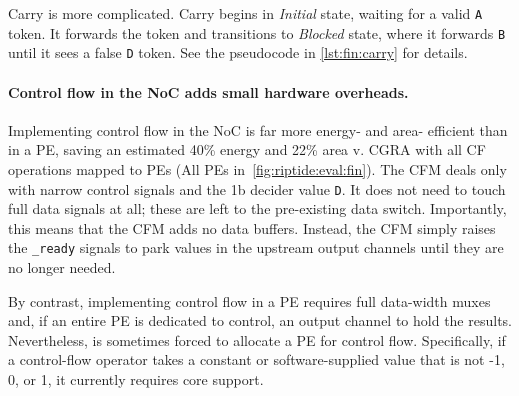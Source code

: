 Carry is more complicated.
%
Carry begins in {\em Initial} state, waiting for a valid {\tt A}
token.
%
It forwards the token and transitions to {\em Blocked} state, where
it forwards {\tt B} until it sees a false {\tt D} token.
%
See the pseudocode in \autoref{lst:fin:carry} for details.

\paragraph{Control flow in the NoC adds small hardware overheads.}
%
Implementing control flow in the NoC is far more energy- and
area- efficient than in a PE, saving an estimated 40\% energy and 22\% area v. CGRA with all CF operations mapped to PEs (All PEs in~\autoref{fig:riptide:eval:fin}).
%
The CFM deals only with narrow control signals and the 1b decider
value {\tt D}.
%
It does not need to touch full data signals at all; these are
left to the pre-existing data switch.
%
Importantly, this means that the CFM adds no data buffers.
%
Instead, the CFM simply raises the {\tt *\_ready} signals to park
values in the upstream output channels until they are no longer
needed.

By contrast, implementing control flow in a PE requires full
data-width muxes and, if an entire PE is dedicated to control, an
output channel to hold the results.
%
Nevertheless, \riptide is sometimes forced to allocate a PE for control
flow.
%
Specifically, if a control-flow operator takes a constant or
software-supplied value that is not -1, 0, or 1, it currently requires \textmu core support.




  

